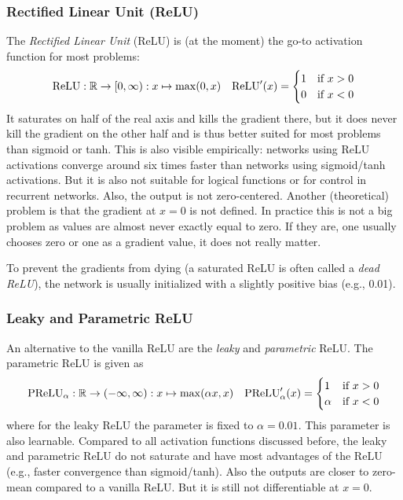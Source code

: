 		\subsubsection{Rectified Linear Unit (ReLU)}
			The \emph{Rectified Linear Unit} (ReLU) is (at the moment) the go-to activation function for most problems:
			\begin{align}
				\mathrm{ReLU} : \mathbb{R} \to [0, \infty) : x \mapsto \max(0, x) &  &
				\mathrm{ReLU}'(x) =
				\begin{cases}
					1 & \text{if } x > 0 \\
					0 & \text{if } x < 0
				\end{cases}
			\end{align}
			It saturates on half of the real axis and kills the gradient there, but it does never kill the gradient on the other half and is thus better suited for most problems than sigmoid or tanh. This is also visible empirically: networks using ReLU activations converge around six times faster than networks using sigmoid/tanh activations. But it is also not suitable for logical functions or for control in recurrent networks. Also, the output is not zero-centered. Another (theoretical) problem is that the gradient at \(x = 0\) is not defined. In practice this is not a big problem as values are almost never exactly equal to zero. If they are, one usually chooses zero or one as a gradient value, it does not really matter.

			To prevent the gradients from dying (a saturated ReLU is often called a \emph{dead ReLU}), the network is usually initialized with a slightly positive bias (e.g., \num{0.01}).

		\subsubsection{Leaky and Parametric ReLU}
			An alternative to the vanilla ReLU are the \emph{leaky} and \emph{parametric} ReLU. The parametric ReLU is given as
			\begin{align}
				\mathrm{PReLU}_\alpha : \mathbb{R} \to (-\infty, \infty) : x \mapsto \max(\alpha x, x) &  &
				\mathrm{PReLU}_\alpha'(x) =
				\begin{cases}
					1      & \text{if } x > 0 \\
					\alpha & \text{if } x < 0
				\end{cases}
			\end{align}
			where for the leaky ReLU the parameter is fixed to \( \alpha = 0.01 \). This parameter is also learnable. Compared to all activation functions discussed before, the leaky and parametric ReLU do not saturate and have most advantages of the ReLU (e.g., faster convergence than sigmoid/tanh). Also the outputs are closer to zero-mean compared to a vanilla ReLU. But it is still not differentiable at \( x = 0 \).

